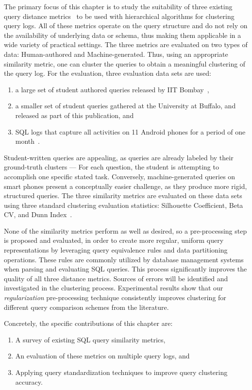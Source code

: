The primary focus of this chapter is to study the suitability of three existing query distance metrics~\cite{aouiche2006,aligon2014similarity,makiyama2015text} to be used with hierarchical algorithms for clustering query logs. All of these metrics operate on the query structure and do not rely on the availability of underlying data or schema, thus making them applicable in a wide variety of practical settings. 
The three metrics are evaluated on two types of data: Human-authored and Machine-generated.
Thus, using an appropriate similarity metric, one can cluster the queries to obtain a meaningful clustering of the query log. 
For the evaluation, three evaluation data sets are used:
\begin{enumerate}
\item a large set of student authored queries released by IIT Bombay~\cite{chandra2015Data},
\item a smaller set of student queries gathered at 
the University at Buffalo,
and released as part of this publication, and
\item SQL logs that capture all activities on 11 Android phones for a period of one month~\cite{pocketdata}.
\end{enumerate}
Student-written queries are appealing, as queries are already labeled by their ground-truth clusters --- For each question, the student is attempting to accomplish one specific stated task.
Conversely, machine-generated queries on smart phones present a conceptually easier challenge, as they produce more rigid, structured queries.
The three similarity metrics are evaluated on these data sets using three standard clustering evaluation statistics: Silhouette Coefficient, Beta CV, and Dunn Index~\cite{zaki2014data}. 

None of the similarity metrics perform as well as desired, so a pre-processing step is proposed and evaluated, in order to create more regular, uniform query representations by leveraging query equivalence rules and data partitioning operations. These rules are commonly utilized by database management systems when parsing and evaluating SQL queries.
This process significantly improves the quality of all three distance metrics.
Sources of errors will be identified and investigated in the clustering process. 
Experimental results show that our \emph{regularization} pre-processing technique consistently improves clustering for different query comparison schemes from the literature.

Concretely, the specific contributions of this chapter are:
\begin{enumerate}
\item A survey of existing SQL query similarity metrics,
\item An evaluation of these metrics on multiple query logs, and 
\item Applying query standardization techniques to improve query clustering accuracy.
\end{enumerate}


